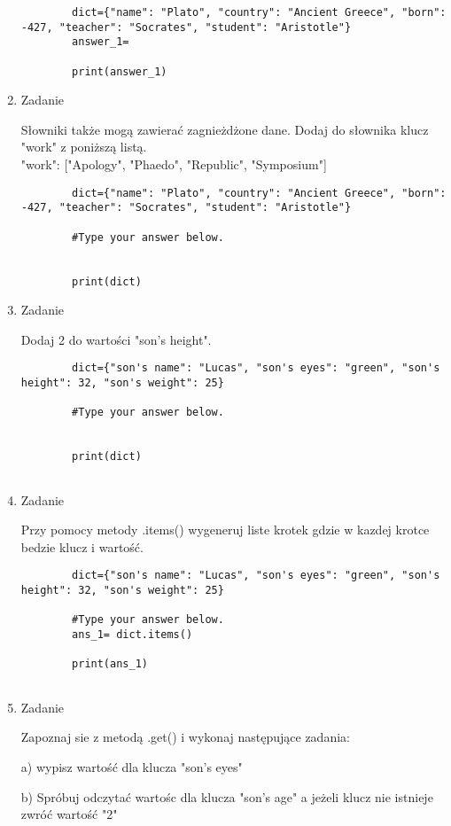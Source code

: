 \documentclass[11pt]{article}
\begin{document}
\begin{enumerate}
	\begin{lstlisting}
		dict={"name": "Plato", "country": "Ancient Greece", "born": -427, "teacher": "Socrates", "student": "Aristotle"}
		answer_1=
		
		print(answer_1)
	\end{lstlisting}

	\item
	\begin{Large}
		Zadanie
	\end{Large}
	\par
	Słowniki także mogą zawierać zagnieżdżone dane. Dodaj do słownika klucz "work" z poniższą listą.\\
	"work": ["Apology", "Phaedo", "Republic", "Symposium"]
	\begin{lstlisting}
		dict={"name": "Plato", "country": "Ancient Greece", "born": -427, "teacher": "Socrates", "student": "Aristotle"}
		
		#Type your answer below.
		
		
		print(dict)
	\end{lstlisting}

	\item 
	\begin{Large}
		Zadanie
	\end{Large}
	\par
	Dodaj 2 do wartości "son's height".
	\begin{lstlisting}
		dict={"son's name": "Lucas", "son's eyes": "green", "son's height": 32, "son's weight": 25}
		
		#Type your answer below.
		
		
		print(dict)
		
	\end{lstlisting}

	\item 
	\begin{Large}
		Zadanie
	\end{Large}
	\par
	Przy pomocy metody .items() wygeneruj liste krotek gdzie w kazdej krotce bedzie klucz i wartość.
	\begin{lstlisting}
		dict={"son's name": "Lucas", "son's eyes": "green", "son's height": 32, "son's weight": 25}
		
		#Type your answer below.
		ans_1= dict.items()
		
		print(ans_1)
		
	\end{lstlisting}
 
 	\item 
 	\begin{Large}
 		Zadanie
 	\end{Large}
 	\par
 	Zapoznaj sie z metodą .get() i wykonaj następujące zadania:
 	\par
 	a) wypisz wartość dla klucza "son's eyes"
 	\par
 	b) Spróbuj odczytać wartośc dla klucza  "son's age" a jeżeli klucz nie istnieje zwróć wartość "2"
 	

\end{enumerate}
\end{document}

